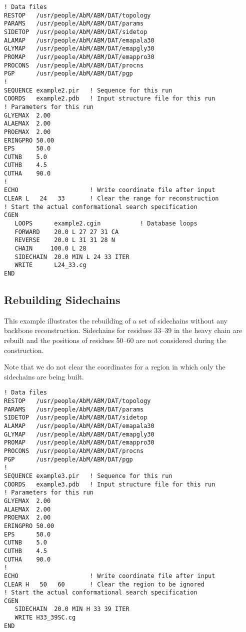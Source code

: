 \begin{verbatim}
! Data files
RESTOP   /usr/people/AbM/ABM/DAT/topology
PARAMS   /usr/people/AbM/ABM/DAT/params
SIDETOP  /usr/people/AbM/ABM/DAT/sidetop
ALAMAP   /usr/people/AbM/ABM/DAT/emapala30
GLYMAP   /usr/people/AbM/ABM/DAT/emapgly30
PROMAP   /usr/people/AbM/ABM/DAT/emappro30
PROCONS  /usr/people/AbM/ABM/DAT/procns
PGP      /usr/people/AbM/ABM/DAT/pgp
!
SEQUENCE example2.pir   ! Sequence for this run
COORDS   example2.pdb   ! Input structure file for this run
! Parameters for this run
GLYEMAX  2.00
ALAEMAX  2.00
PROEMAX  2.00
ERINGPRO 50.00
EPS      50.0
CUTNB    5.0
CUTHB    4.5
CUTHA    90.0
!
ECHO                    ! Write coordinate file after input
CLEAR L   24   33       ! Clear the range for reconstruction
! Start the actual conformational search specification
CGEN
   LOOPS      example2.cgin           ! Database loops
   FORWARD    20.0 L 27 27 31 CA
   REVERSE    20.0 L 31 31 28 N
   CHAIN     100.0 L 28
   SIDECHAIN  20.0 MIN L 24 33 ITER
   WRITE      L24_33.cg
END
\end{verbatim}






\subsection{Rebuilding Sidechains}
This example illustrates the rebuilding of a set of sidechains
without any backbone reconstruction. Sidechains for residues 33--39
in the heavy chain are rebuilt and the positions of residues 50--60
are not considered during the construction.

Note that we do not clear the coordinates for a region in which 
only the sidechains are being built.

\begin{verbatim}
! Data files
RESTOP   /usr/people/AbM/ABM/DAT/topology
PARAMS   /usr/people/AbM/ABM/DAT/params
SIDETOP  /usr/people/AbM/ABM/DAT/sidetop
ALAMAP   /usr/people/AbM/ABM/DAT/emapala30
GLYMAP   /usr/people/AbM/ABM/DAT/emapgly30
PROMAP   /usr/people/AbM/ABM/DAT/emappro30
PROCONS  /usr/people/AbM/ABM/DAT/procns
PGP      /usr/people/AbM/ABM/DAT/pgp
!
SEQUENCE example3.pir   ! Sequence for this run
COORDS   example3.pdb   ! Input structure file for this run
! Parameters for this run
GLYEMAX  2.00
ALAEMAX  2.00
PROEMAX  2.00
ERINGPRO 50.00
EPS      50.0
CUTNB    5.0
CUTHB    4.5
CUTHA    90.0
!
ECHO                    ! Write coordinate file after input
CLEAR H   50   60       ! Clear the region to be ignored
! Start the actual conformational search specification
CGEN
   SIDECHAIN  20.0 MIN H 33 39 ITER
   WRITE H33_39SC.cg
END
\end{verbatim}

